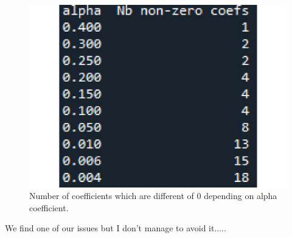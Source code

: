 \documentclass{article}
\begin{document}
\begin{itemize}
\begin{figure}[!ht]
    \includegraphics[scale=0.2]{./images/nb_non_zero_ionosphere.pdf}
    \caption{Number of coefficients which are different of $0$ depending on alpha coefficient.}
\end{figure}
\end{itemize}
We find one of our issues but I don't manage to avoid it.....
\newpage


\end{document}
